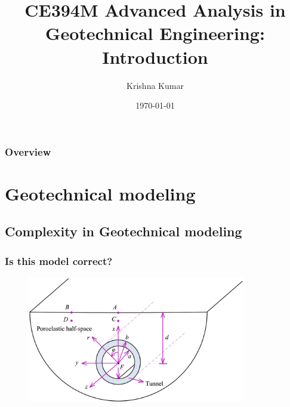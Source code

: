 \documentclass[notes]{beamer}
\title[CE394M: Intro to geotech analysis]{CE394M Advanced Analysis in Geotechnical Engineering: Introduction}
\author{Krishna Kumar} %
\institute[UT Austin] %
{
University of Texas at Austin \\
\medskip
\textit{
  \url{krishnak@utexas.edu}} %
}
\date{\today} %
\begin{document}
\begin{frame}
\titlepage %
\end{frame}

\begin{frame}
 \frametitle{Overview}
 \tableofcontents
\end{frame}


\section{Geotechnical modeling}

\subsection{Complexity in Geotechnical modeling}
\begin{frame}
	\frametitle{Is this model correct?}
	\begin{figure}
		\includegraphics[width=0.85\textwidth]{figs/tunnel-halfspace.png}
	\end{figure}
\end{frame}
\end{document}
